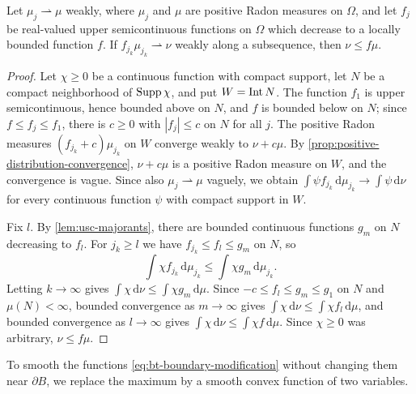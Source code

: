 \begin{lemma}\label{lem:usc-weight-weak-limit}
Let $\mu_j\rightharpoonup\mu$ weakly, where $\mu_j$ and $\mu$ are positive Radon measures on $\Omega$, and let $f_j$ be real-valued upper semicontinuous functions on $\Omega$ which decrease to a locally bounded function $f$. If $f_{j_k}\mu_{j_k}\rightharpoonup\nu$ weakly along a subsequence, then $\nu\le f\mu$.
\end{lemma}
\begin{proof}
Let $\chi\ge0$ be a continuous function with compact support, let $N$ be a compact neighborhood of $\operatorname{Supp}\chi$, and put $W=\operatorname{Int} N$. The function $f_1$ is upper semicontinuous, hence bounded above on $N$, and $f$ is bounded below on $N$; since $f\le f_j\le f_1$, there is $c\ge0$ with $|f_j|\le c$ on $N$ for all $j$. The positive Radon measures $(f_{j_k}+c)\mu_{j_k}$ on $W$ converge weakly to $\nu+c\mu$. By \cref{prop:positive-distribution-convergence}, $\nu+c\mu$ is a positive Radon measure on $W$, and the convergence is vague. Since also $\mu_j\rightharpoonup\mu$ vaguely, we obtain $\int\psi f_{j_k}\,\mathrm d\mu_{j_k}\to\int\psi\,\mathrm d\nu$ for every continuous function $\psi$ with compact support in $W$.

Fix $l$. By \cref{lem:usc-majorants}, there are bounded continuous functions $g_m$ on $N$ decreasing to $f_l$. For $j_k\ge l$ we have $f_{j_k}\le f_l\le g_m$ on $N$, so
\[
 \int\chi f_{j_k}\,\mathrm{d}\mu_{j_k}\le\int\chi g_m\,\mathrm{d}\mu_{j_k}.
\]
Letting $k\to\infty$ gives $\int\chi\,\mathrm{d}\nu\le\int\chi g_m\,\mathrm{d}\mu$. Since $-c\le f_l\le g_m\le g_1$ on $N$ and $\mu(N)<\infty$, bounded convergence as $m\to\infty$ gives $\int\chi\,\mathrm{d}\nu\le\int\chi f_l\,\mathrm{d}\mu$, and bounded convergence as $l\to\infty$ gives $\int\chi\,\mathrm{d}\nu\le\int\chi f\,\mathrm{d}\mu$. Since $\chi\ge0$ was arbitrary, $\nu\le f\mu$.
\end{proof}

To smooth the functions \eqref{eq:bt-boundary-modification} without changing them near $\partial B$, we replace the maximum by a smooth convex function of two variables.

